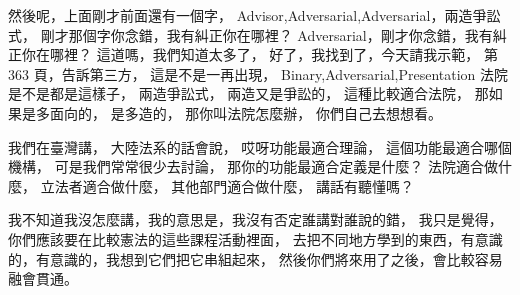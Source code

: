 \hypertarget{w06:cue:2285}{}然後呢，上面剛才前面還有一個字，
\hypertarget{w06:cue:2286}{}Advisor,Adversarial,Adversarial，兩造爭訟式，
\hypertarget{w06:cue:2287}{}剛才那個字你念錯，我有糾正你在哪裡？
\hypertarget{w06:cue:2288}{}Adversarial，剛才你念錯，我有糾正你在哪裡？
\hypertarget{w06:cue:2289}{}這道嗎，我們知道太多了，
\hypertarget{w06:cue:2290}{}好了，我找到了，今天請我示範，
\hypertarget{w06:cue:2291}{}第 363 頁，告訴第三方，
\hypertarget{w06:cue:2292}{}這是不是一再出現，
\hypertarget{w06:cue:2293}{}Binary,Adversarial,Presentation
\hypertarget{w06:cue:2294}{}法院是不是都是這樣子，
\hypertarget{w06:cue:2295}{}兩造爭訟式，
\hypertarget{w06:cue:2296}{}兩造又是爭訟的，
\hypertarget{w06:cue:2297}{}這種比較適合法院，
\hypertarget{w06:cue:2298}{}那如果是多面向的，
\hypertarget{w06:cue:2299}{}是多造的，
\hypertarget{w06:cue:2300}{}那你叫法院怎麼辦，
\hypertarget{w06:cue:2301}{}你們自己去想想看。

\hypertarget{w06:cue:2302}{}我們在臺灣講，
\hypertarget{w06:cue:2303}{}大陸法系的話會說，
\hypertarget{w06:cue:2304}{}哎呀功能最適合理論，
\hypertarget{w06:cue:2305}{}這個功能最適合哪個機構，
\hypertarget{w06:cue:2306}{}可是我們常常很少去討論，
\hypertarget{w06:cue:2307}{}那你的功能最適合定義是什麼？
\hypertarget{w06:cue:2308}{}法院適合做什麼，
\hypertarget{w06:cue:2309}{}立法者適合做什麼，
\hypertarget{w06:cue:2310}{}其他部門適合做什麼，
\hypertarget{w06:cue:2311}{}講話有聽懂嗎？

\hypertarget{w06:cue:2312}{}我不知道我沒怎麼講，我的意思是，我沒有否定誰講對誰說的錯，
\hypertarget{w06:cue:2313}{}我只是覺得，你們應該要在比較憲法的這些課程活動裡面，
\hypertarget{w06:cue:2314}{}去把不同地方學到的東西，有意識的，有意識的，我想到它們把它串組起來，
\hypertarget{w06:cue:2315}{}然後你們將來用了之後，會比較容易融會貫通。

